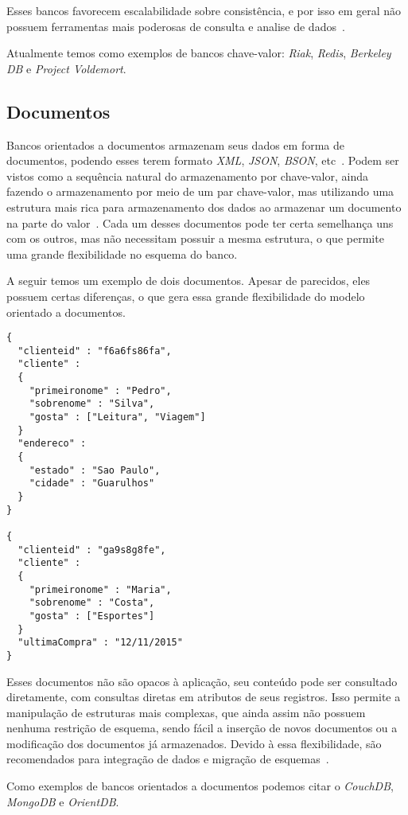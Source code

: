 Esses bancos favorecem escalabilidade sobre consistência, e por isso em geral não possuem ferramentas mais poderosas de consulta e analise de dados~\cite{chrisnosql}.

Atualmente temos como exemplos de bancos chave-valor: \emph{Riak}, \emph{Redis}, \emph{Berkeley DB} e \emph{Project Voldemort}.

\subsection*{Documentos}
Bancos orientados a documentos armazenam seus dados em forma de documentos, podendo esses terem formato \emph{XML}, \emph{JSON}, \emph{BSON}, etc~\cite{pramod}. Podem ser vistos como a sequência natural do armazenamento por chave-valor, ainda fazendo o armazenamento por meio de um par chave-valor, mas utilizando uma estrutura mais rica para armazenamento dos dados ao armazenar um documento na parte do valor~\cite{chrisnosql}. Cada um desses documentos pode ter certa semelhança uns com os outros, mas não necessitam possuir a mesma estrutura, o que permite uma grande flexibilidade no esquema do banco.

A seguir temos um exemplo de dois documentos. Apesar de parecidos, eles possuem certas diferenças, o que gera essa grande flexibilidade do modelo orientado a documentos.

\begin{lstlisting}
{
  "clienteid" : "f6a6fs86fa",
  "cliente" :
  {
    "primeironome" : "Pedro",
    "sobrenome" : "Silva", 
    "gosta" : ["Leitura", "Viagem"]
  }
  "endereco" : 
  {
    "estado" : "Sao Paulo",
    "cidade" : "Guarulhos"
  }
}

{
  "clienteid" : "ga9s8g8fe",
  "cliente" :
  {
    "primeironome" : "Maria",
    "sobrenome" : "Costa", 
    "gosta" : ["Esportes"]
  }
  "ultimaCompra" : "12/11/2015"
}
\end{lstlisting}

Esses documentos não são opacos à aplicação, seu conteúdo pode ser consultado diretamente, com consultas diretas em atributos de seus registros. Isso permite a manipulação de estruturas mais complexas, que ainda assim não possuem nenhuma restrição de esquema, sendo fácil a inserção de novos documentos ou a modificação dos documentos já armazenados. Devido à essa flexibilidade, são recomendados para integração de dados e migração de esquemas~\cite{nosqleval}. 

Como exemplos de bancos orientados a documentos podemos citar o \emph{CouchDB}, \emph{MongoDB} e \emph{OrientDB}.

